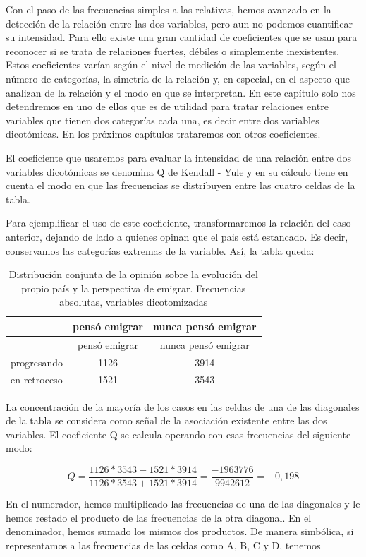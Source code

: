 \documentclass[]{book}
\begin{document}
Con el paso de las frecuencias simples a las relativas, hemos avanzado en la detección de la relación entre las dos variables, pero aun no podemos cuantificar su intensidad. Para ello existe una gran cantidad de coeficientes que se usan para reconocer si se trata de relaciones fuertes, débiles o simplemente inexistentes. Estos coeficientes varían según el nivel de medición de las variables, según el número de categorías, la simetría de la relación y, en especial, en el aspecto que analizan de la relación y el modo en que se interpretan. En este capítulo solo nos detendremos en uno de ellos que es de utilidad para tratar relaciones entre variables que tienen dos categorías cada una, es decir entre dos variables dicotómicas. En los próximos capítulos trataremos con otros coeficientes.

El coeficiente que usaremos para evaluar la intensidad de una relación entre dos variables dicotómicas se denomina Q de Kendall - Yule y en su cálculo tiene en cuenta el modo en que las frecuencias se distribuyen entre las cuatro celdas de la tabla.

Para ejemplificar el uso de este coeficiente, transformaremos la
relación del caso anterior, dejando de lado a quienes opinan que el pais está estancado. Es decir, conservamos las categorías extremas de la variable. Así, la tabla queda:

\begin{longtable}[]{@{}lcc@{}}
\caption{\label{tab:unnamed-chunk-137}Distribución conjunta de la opinión sobre la evolución del propio país y la perspectiva de emigrar. Frecuencias absolutas, variables dicotomizadas}\tabularnewline
\toprule
& pensó emigrar & nunca pensó emigrar\tabularnewline
\midrule
\endfirsthead
\toprule
& pensó emigrar & nunca pensó emigrar\tabularnewline
\midrule
\endhead
progresando & 1126 & 3914\tabularnewline
en retroceso & 1521 & 3543\tabularnewline
\bottomrule
\end{longtable}

La concentración de la mayoría de los casos en las celdas de una de las diagonales de la tabla se considera como señal de la asociación existente entre las dos variables. El coeficiente Q se calcula operando con esas frecuencias del siguiente modo:

\[Q = \frac{1126*3543 - 1521*3914}{1126*3543 + 1521*3914} = \frac{-1963776}{9942612} = -0,198\]

En el numerador, hemos multiplicado las frecuencias de una de las
diagonales y le hemos restado el producto de las frecuencias
de la otra diagonal. En el denominador, hemos sumado los mismos
dos productos. De manera simbólica, si representamos a las frecuencias
de las celdas como A, B, C y D, tenemos
\end{document}
